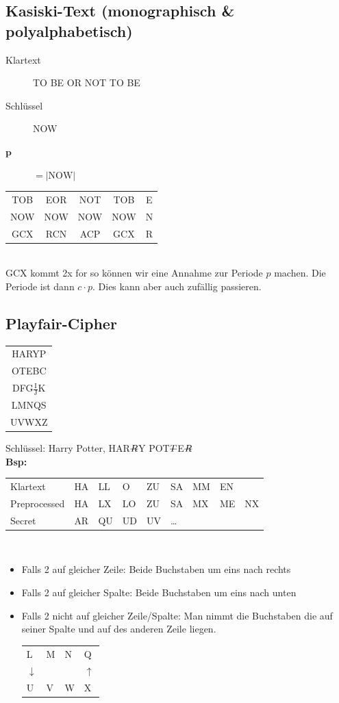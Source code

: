 \documentclass[10pt]{article}
\newcommand{\Bold}[1]{\textbf{#1}} %
\newcommand{\T}[1]{\text{#1}} %
\newcommand{\Nicht}[1]{\T{\sout{$ #1 $}}} %
\newcommand{\Abs}[1]{\left| #1 \right|} %
\begin{document}
\subsection{Kasiski-Text (monographisch \& polyalphabetisch)}
\begin{description}
	\item[Klartext] TO BE OR NOT TO BE
	\item[Schlüssel] NOW
	\item[$\mathbf{p}$] $=\Abs{\T{NOW}}$
\end{description}
\begin{tabular}{c|c|c|c|c}
 TOB&EOR&NOT&TOB&E\\
 NOW&NOW&NOW&NOW&N\\
 GCX&RCN&ACP&GCX&R
\end{tabular}\\
GCX kommt 2x for so können wir eine Annahme zur Periode $p$ machen. Die Periode ist dann $c\cdot p$. Dies kann aber auch zufällig passieren.
\subsection{Playfair-Cipher}
\begin{tabular}{|c|}\hline
 HARYP\\
 OTEBC\\
 DFG$\frac{\T{I}}{\T{J}}$K\\
 LMNQS\\
 UVWXZ\\\hline
\end{tabular}
Schlüssel: Harry Potter, HAR$\Nicht{R}$Y POT$\Nicht{T}$E$\Nicht{R}$\\
\Bold{Bsp:}
\begin{tabular}{lllllllll}
 Klartext&HA&LL&O&ZU&SA&MM&EN\\
 Preprocessed&HA&LX&LO&ZU&SA&MX&ME&NX\\
 Secret&AR&QU&UD&UV&\dots\\
\end{tabular}\\
\begin{itemize}
 \item Falls 2 auf gleicher Zeile: Beide Buchstaben um eins nach rechts
 \item Falls 2 auf gleicher Spalte: Beide Buchstaben um eins nach unten
 \item Falls 2 nicht auf gleicher Zeile/Spalte: Man nimmt die Buchstaben die auf seiner Spalte und auf des anderen Zeile liegen.\\
 \begin{tabular}{llll}
  L&M&N&Q\\
  $\downarrow$&&&$\uparrow$\\
  U&V&W&X\\
 \end{tabular}
\end{itemize}
\end{document}
